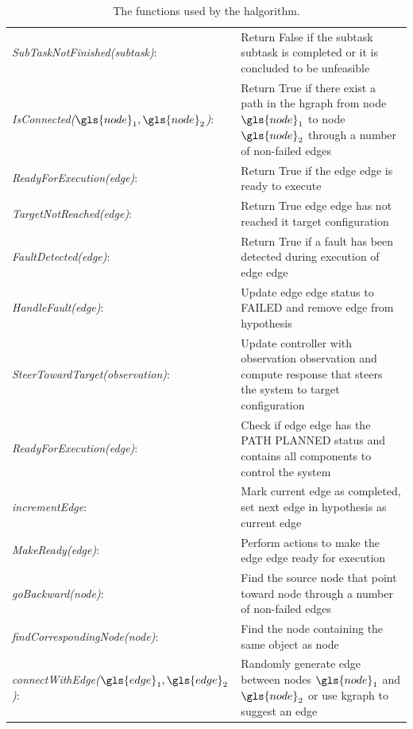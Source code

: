 \begin{table}[H]
\centering
\begin{tabular}%
  {>{\raggedright\arraybackslash}p{}%
   >{\raggedright\arraybackslash}p{}}
\textit{SubTaskNotFinished(\gls{subtask})}:& Return False if the subtask \gls{subtask} is completed or it is concluded to be unfeasible \\
\textit{IsConnected($\gls{node}_1, \gls{node}_2$)}:& Return True if there exist a path in the \ac{hgraph} from node $\gls{node}_1$  to node $\gls{node}_2$ through a number of non-failed edges\\
\textit{ReadyForExecution(\gls{edge})}: & Return True if the edge \gls{edge} is ready to execute\\
\textit{TargetNotReached(\gls{edge})}: & Return True edge \gls{edge} has not reached it target configuration\\
\textit{FaultDetected(\gls{edge})}: & Return True if a fault has been detected during execution of edge \gls{edge}\\

\textit{HandleFault(\gls{edge})}: & Update edge \gls{edge} status to FAILED and remove edge from hypothesis \\
\textit{SteerTowardTarget(\gls{observation})}: & Update controller with observation \gls{observation} and compute response that steers the system to target configuration\\
\textit{ReadyForExecution(\gls{edge})}: & Check if edge \gls{edge} has the PATH PLANNED status and contains all components to control the system \\
\textit{incrementEdge}: & Mark current edge as completed, set next edge in \gls{hypothesis} as current edge \\
\textit{MakeReady(\gls{edge})}: & Perform actions to make the edge \gls{edge} ready for execution \\
\textit{goBackward(\gls{node})}: & Find the source node that point toward \gls{node} through a number of non-failed edges\\
\textit{findCorrespondingNode(\gls{node})}: & Find the node containing the same object as \gls{node} \\
\textit{connectWithEdge($\gls{edge}_1, \gls{edge}_2$)}: & Randomly generate edge between nodes $\gls{node}_1$ and $\gls{node}_2$ or use \ac{kgraph} to suggest an edge\\
\end{tabular}
\caption{The functions used by the \ac{halgorithm}.}
\label{table:functions_for_halgorithm}
\end{table}

